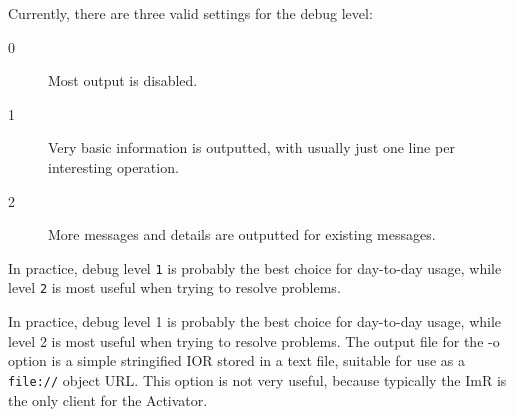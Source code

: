 \begin{small}
\end{small}

Currently, there are three valid settings for the debug level:

\begin{description}
\item[0] Most output is disabled.
\item[1] Very basic information is outputted, with usually just one line per
interesting operation.
\item [2] More messages and details are outputted for existing messages.
\end{description}

In practice, debug level {\tt 1} is probably the best choice for day-to-day usage, while level {\tt 2} is most
useful when trying to resolve problems.

In practice, debug level 1 is probably the best choice for day-to-day usage, while level 2 is most useful
when trying to resolve problems.
The output file for the -o option is a simple stringified IOR stored in a text file, suitable for use as a
{\tt file://} object URL. This option is not very useful, because typically the ImR is the only client for
the Activator.

